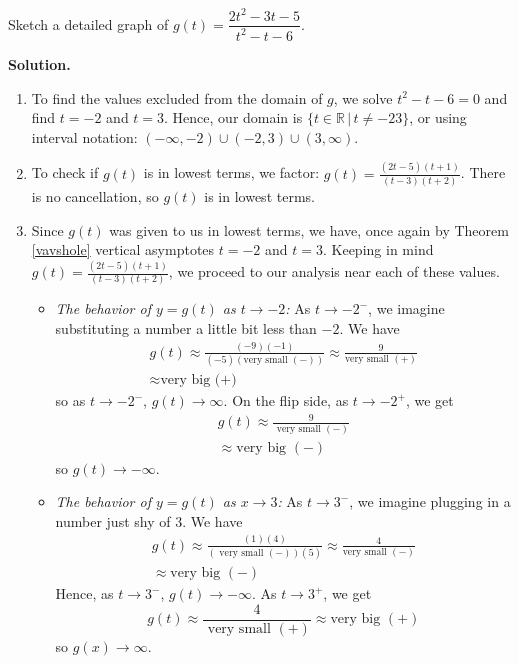 \begin{ex}  Sketch a detailed graph of $g(t) = \dfrac{2t^2-3t-5}{t^2-t-6}$.

{\bf Solution.}

\begin{enumerate}

\item  To find the values excluded from the domain of $g$, we solve  $t^2-t-6 = 0$ and find $t = -2$ and $t=3$.  Hence, our domain is $\{ t \in \mathbb{R} \, | \, t \neq -2 3 \}$, or using interval notation: $(-\infty, -2) \cup (-2,3) \cup (3,\infty)$.

\item  To check if $g(t)$ is in lowest terms, we factor:  $g(t) = \frac{(2t-5)(t+1)}{(t-3)(t+2)}$.  There is no cancellation, so $g(t)$ is in lowest terms.

\item  Since $g(t)$ was given to us in lowest terms, we have, once again by Theorem \ref{vavshole} vertical asymptotes $t=-2$ and $t=3$.  Keeping in mind $g(t) = \frac{(2t-5)(t+1)}{(t-3)(t+2)}$, we proceed to our analysis near each of these values.

\begin{itemize}

\item  \textit{The behavior of $y=g(t)$ as $t \rightarrow -2$:}  As $t \rightarrow -2^{-}$, we imagine substituting a number a little bit less than $-2$. We have
\begin{multline*}
     g(t) \approx \frac{(-9)(-1)}{(-5)(\text{very small $(-)$})} \approx \frac{9}{\text{very small $(+)$}} \\
     \approx \text{very big (+)}
\end{multline*}
so as $t \rightarrow -2^{-}$, $g(t) \rightarrow \infty$. On the flip side, as $t \rightarrow -2^{+}$, we get 
\begin{multline*}
     g(t) \approx \frac{9}{\text{ very small $(-)$}} \\
     \approx \text{very big $(-)$}
\end{multline*}
so $g(t) \rightarrow -\infty$.

\item  \textit{The behavior of $y=g(t)$ as $x \rightarrow 3$:}  As $t \rightarrow 3^{-}$, we imagine plugging in a number just shy  of $3$. We have 
\begin{multline*}
     g(t) \approx \frac{(1)(4)}{(\text{ very small $(-)$}) (5)} \approx \frac{4}{\text{very small $(-)$}} \\
     \approx \text{very big $(-)$}
\end{multline*}
Hence, as $t \rightarrow 3^{-}$, $g(t) \rightarrow -\infty$. As $t \rightarrow 3^{+}$, we get \[g(t) \approx \frac{4}{\text{ very small $(+)$}} \approx \text{very big $(+)$}\] so $g(x) \rightarrow \infty$.


\end{itemize}
\end{enumerate}
\end{ex}
